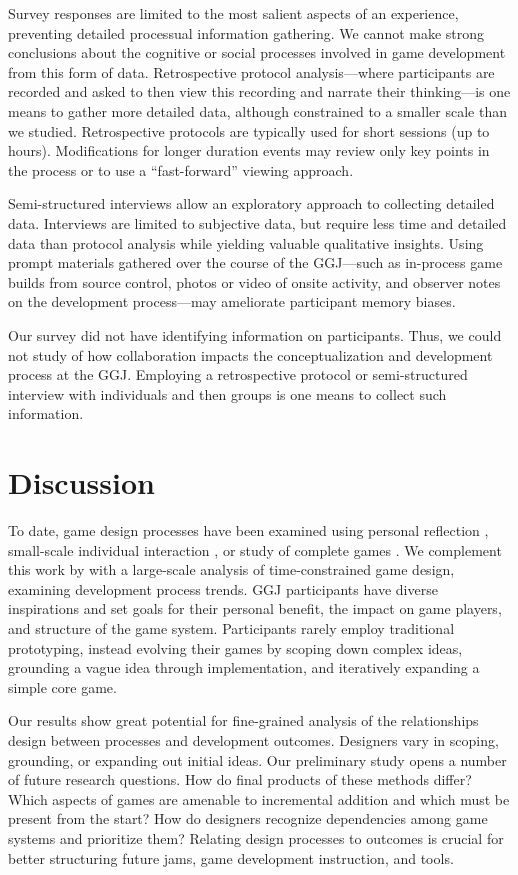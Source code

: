 \documentclass{sig-alternate}
\begin{document}
Survey responses are limited to the most salient aspects of an experience, preventing detailed processual information gathering. We cannot make strong conclusions about the cognitive or social processes involved in game development from this form of data. Retrospective protocol analysis---where participants are recorded and asked to then view this recording and narrate their thinking---is one means to gather more detailed data, although constrained to a smaller scale than we studied. Retrospective protocols are typically used for short sessions (up to hours). Modifications for longer duration events may review only key points in the process or to use a ``fast-forward'' viewing approach. 

Semi-structured interviews allow an exploratory approach to collecting detailed data. Interviews are limited to subjective data, but require less time and detailed data than protocol analysis while yielding valuable qualitative insights. Using prompt materials gathered over the course of the GGJ---such as in-process game builds from source control, photos or video of onsite activity, and observer notes on the development process---may ameliorate participant memory biases.

Our survey did not have identifying information on participants. Thus, we could not study of how collaboration impacts the conceptualization and development process at the GGJ. Employing a retrospective protocol or semi-structured interview with individuals and then groups is one means to collect such information.


\section{Discussion}
To date, game design processes have been examined using personal reflection \cite{anthropy2012:zinesters,hunicke2004:mda}, small-scale individual interaction \cite{nelson2009:reqanal}, or study of complete games \cite{bogost2011:howto}. We complement this work by with a large-scale analysis of time-constrained game design, examining development process trends.
GGJ participants have diverse inspirations and set goals for their personal benefit, the impact on game players, and structure of the game system.
Participants rarely employ traditional prototyping, instead evolving their games by scoping down complex ideas, grounding a vague idea through implementation, and iteratively expanding a simple core game.

Our results show great potential for fine-grained analysis of the relationships design between processes and development outcomes. Designers vary in scoping, grounding, or expanding out initial ideas. Our preliminary study opens a number of future research questions. How do final products of these methods differ? Which aspects of games are amenable to incremental addition and which must be present from the start? How do designers recognize dependencies among game systems and prioritize them? Relating design processes to outcomes is crucial for better structuring future jams, game development instruction, and tools.
\end{document}
